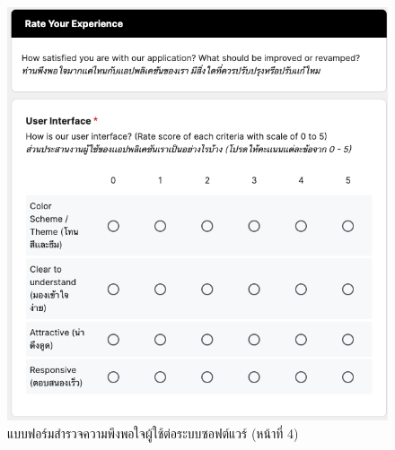 \documentclass[12pt,one side,openright,a4paper]{cpe-thesis-th}
\begin{document}
\begin{figure}[H]
    \centering
    \includegraphics[width=15cm]{figure/results/forms/survey-google-p3-1.png}
    \caption[แบบฟอร์มสำรวจความพึงพอใจผู้ใช้ต่อระบบซอฟต์แวร์ (หน้าที่ 4)]{แบบฟอร์มสำรวจความพึงพอใจผู้ใช้ต่อระบบซอฟต์แวร์ (หน้าที่ 4)}
\end{figure}
\end{document}
